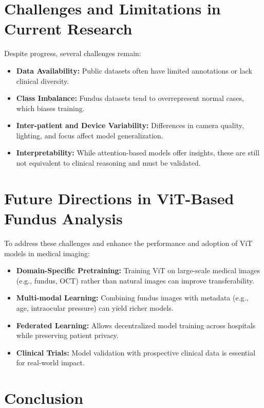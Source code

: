 \documentclass[a4paper,12pt]{report}
\begin{document}
\section*{Challenges and Limitations in Current Research}

Despite progress, several challenges remain:
\begin{itemize}
    \item \textbf{Data Availability:} Public datasets often have limited annotations or lack clinical diversity.
    \item \textbf{Class Imbalance:} Fundus datasets tend to overrepresent normal cases, which biases training.
    \item \textbf{Inter-patient and Device Variability:} Differences in camera quality, lighting, and focus affect model generalization.
    \item \textbf{Interpretability:} While attention-based models offer insights, these are still not equivalent to clinical reasoning and must be validated.
\end{itemize}

\section*{Future Directions in ViT-Based Fundus Analysis}

To address these challenges and enhance the performance and adoption of ViT models in medical imaging:
\begin{itemize}
    \item \textbf{Domain-Specific Pretraining:} Training ViT on large-scale medical images (e.g., fundus, OCT) rather than natural images can improve transferability.
    \item \textbf{Multi-modal Learning:} Combining fundus images with metadata (e.g., age, intraocular pressure) can yield richer models.
    \item \textbf{Federated Learning:} Allows decentralized model training across hospitals while preserving patient privacy.
    \item \textbf{Clinical Trials:} Model validation with prospective clinical data is essential for real-world impact.
\end{itemize}

\section*{Conclusion}
\end{document}
